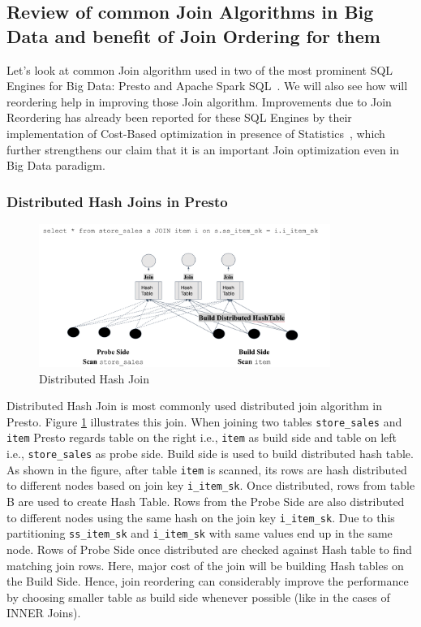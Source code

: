 \subsection{Review of common Join Algorithms in Big Data and benefit of Join Ordering for them}
Let's look at common Join algorithm used in two of the most prominent SQL Engines for Big Data: Presto and Apache Spark SQL~\cite{b13}. We will also see how will reordering help in improving those Join algorithm. Improvements due to Join Reordering has already been reported for these SQL Engines by their implementation of Cost-Based optimization in presence of Statistics~\cite{b2}, which further strengthens our claim that it is an important Join optimization even in Big Data paradigm.

\subsubsection{Distributed Hash Joins in Presto}

\begin{figure}[ht]
    \centerline{\includegraphics[width=9.5cm]{fig/DistributedHashJoin.png}}
    \caption{Distributed Hash Join}
    \label{distributed_hash_join}
\end{figure}

Distributed Hash Join is most commonly used distributed join algorithm in Presto.
Figure \ref{distributed_hash_join} illustrates this join.
When joining two tables \texttt{store\_sales} and \texttt{item} Presto regards table on the right i.e., \texttt{item} as build side and table on left i.e., \texttt{store\_sales} as probe side.
Build side is used to build distributed hash table. As shown in the figure, after table \texttt{item} is scanned, its rows are hash distributed to different nodes based on join key \texttt{i\_item\_sk}. Once distributed, rows from table B are used to create Hash Table. Rows from the Probe Side are also distributed to different nodes using the same hash on the join key \texttt{i\_item\_sk}. Due to this partitioning \texttt{ss\_item\_sk}  and \texttt{i\_item\_sk} with same values end up in the same node.  Rows of Probe Side once distributed are checked against Hash table to find matching join rows. Here, major cost of the join will be building Hash tables on the Build Side. Hence, join reordering can considerably improve the performance by choosing smaller table as build side whenever possible (like in the cases of INNER Joins).

